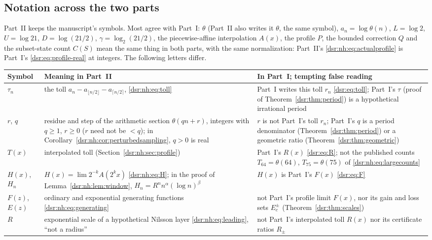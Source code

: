 \documentclass[11pt,a4paper]{article}
\numberwithin{equation}{section}
\theoremstyle{definition}
\theoremstyle{remark}
\newcommand{\tht}{\theta}
\theoremstyle{definition}
\theoremstyle{plain}
\begin{document}
\subsection{Notation across the two parts}
\label{dsr:nh:sec:notation}
Part~II keeps the manuscript's symbols. Most agree with Part~I:
$\theta$ (Part~II also writes it $\tht$, the same symbol), $a_n=\log\theta(n)$,
$L=\log2$, $U=\log21$, $D=\log(21/2)$, $\gamma=\log_2(21/2)$, the
piecewise-affine interpolation $A(x)$, the profile $P$, the bounded
correction $Q$ and the subset-state count $C(S)$ mean the same thing in
both parts, with the same normalization:
Part~II's \eqref{dsr:nh:eq:actualprofile} is Part~I's
\eqref{dsr:eq:profile-real} at integers. The following letters differ.
\begin{center}\small
\begin{tabularx}{\linewidth}{@{}l>{\raggedright\arraybackslash}X>{\raggedright\arraybackslash}X@{}}
\toprule
Symbol & Meaning in Part~II & In Part~I; tempting false reading\\
\midrule
$\tau_n$ & the toll $a_n-a_{\lfloor n/2\rfloor}-a_{\lceil n/2\rceil}$,
 \eqref{dsr:nh:eq:toll} & Part~I writes this toll $r_n$
 \eqref{dsr:eq:toll}; Part~I's $\tau$ (proof of
 Theorem~\ref{dsr:thm:period}) is a hypothetical irrational period\\
$r$, $q$ & residue and step of the arithmetic section $\theta(qn+r)$,
 integers with $q\ge1$, $r\ge0$ ($r$ need not be $<q$); in
 Corollary~\ref{dsr:nh:cor:perturbedsampling}, $q>0$ is real &
 $r$ is not Part~I's toll $r_n$; Part~I's $q$ is a period denominator
 (Theorem~\ref{dsr:thm:period}) or a geometric ratio
 (Theorem~\ref{dsr:thm:geometric})\\
$T(x)$ & interpolated toll (Section~\ref{dsr:nh:sec:profile}) &
 Part~I's $R(x)$ \eqref{dsr:eq:R}; not the published counts
 $T_{64}=\theta(64)$, $T_{75}=\theta(75)$ of
 \eqref{dsr:nh:eq:largecounts}\\
$H(x)$, $H_n$ & $H(x)=\lim2^{-k}A(2^kx)$ \eqref{dsr:nh:eq:H}; in the
 proof of Lemma~\ref{dsr:nh:lem:window}, $H_n=R^nn^\alpha(\log n)^\beta$ &
 $H(x)$ is Part~I's $F(x)$ \eqref{dsr:eq:F}\\
$F(z)$, $E(z)$ & ordinary and exponential generating functions
 \eqref{dsr:nh:eq:generating} & not Part~I's profile limit $F(x)$, nor its
 gain and loss sets $E_c^\pm$ (Theorem~\ref{dsr:thm:scales})\\
$R$ & exponential scale of a hypothetical Nilsson layer
 \eqref{dsr:nh:eq:leading}, ``not a radius'' & not Part~I's interpolated
 toll $R(x)$ nor its certificate ratios $R_\pm$\\

\end{tabularx}
\end{center}
\end{document}
